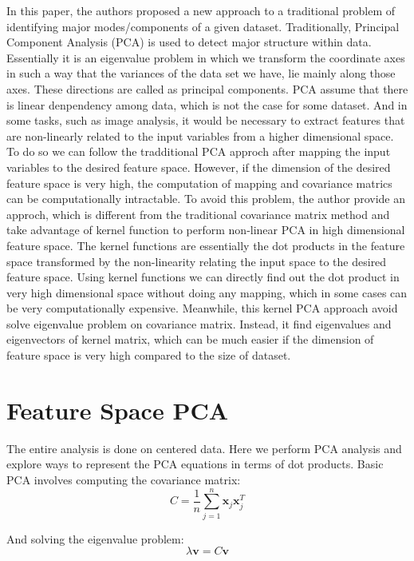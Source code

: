In this paper, the authors proposed a new approach to a traditional problem of identifying major modes/components of a given dataset.
Traditionally, Principal Component Analysis (PCA) is used to detect major structure within data.
Essentially it is an eigenvalue problem in which we transform the coordinate axes in such a way that the variances of the data set we have, lie mainly along those axes.
These directions are called as principal components.
PCA assume that there is linear denpendency among data, which is not the case for some dataset.
And in some tasks, such as image analysis, it would be necessary to extract features that are non-linearly related to the input variables from a higher dimensional space.
To do so we can follow the tradditional PCA approch after mapping the input variables to the desired feature space.
However, if the dimension of the desired feature space is very high, the computation of mapping and covariance matrics can be computationally intractable.
To avoid this problem, the author provide an approch, which is different from the traditional covariance matrix method and take advantage of kernel function to perform non-linear PCA in high dimensional feature space.
The kernel functions are essentially the dot products in the feature space transformed by the non-linearity relating the input space to the desired feature space.
Using kernel functions we can directly find out the dot product in very high dimensional space without doing any mapping, which in some cases can be very computationally expensive.
Meanwhile, this kernel PCA approach avoid solve eigenvalue problem on covariance matrix. Instead, it find eigenvalues and eigenvectors of kernel matrix, which can be much easier if the dimension of feature space is very high compared to the size of dataset.\\

\section{Feature Space PCA}

The entire analysis is done on centered data. Here we perform PCA analysis and explore ways to represent the PCA equations in terms of dot products. Basic PCA involves computing the covariance matrix:
\begin{equation}
C = \frac{1}{n} \sum_{j=1}^n \pmb{x}_j \pmb{x}_j^T
\end{equation}

And solving the eigenvalue problem:
\begin{equation}
\lambda \pmb{v} = C \pmb{v}
\end{equation}

